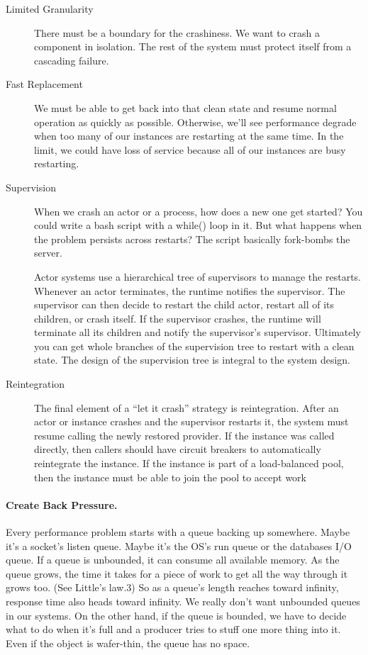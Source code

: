\begin{description}
  \item [Limited Granularity] There must be a boundary for the crashiness. We want to crash a component in isolation. The rest of the system must protect itself from a cascading failure.

  \item [Fast Replacement] We must be able to get back into that clean state and resume normal operation as quickly as possible. Otherwise, we’ll see performance degrade when too many of our instances are restarting at the same time. In the limit, we could have loss of service because all of our instances are busy restarting.

  \item [Supervision] When we crash an actor or a process, how does a new one get started? You could write a bash script with a while() loop in it. But what happens when the problem persists across restarts? The script basically fork-bombs the server.

Actor systems use a hierarchical tree of supervisors to manage the restarts. Whenever an actor terminates, the runtime notifies the supervisor. The supervisor can then decide to restart the child actor, restart all of its children, or crash itself. If the supervisor crashes, the runtime will terminate all its children and notify the supervisor’s supervisor. Ultimately you can get whole branches of the supervision tree to restart with a clean state. The design of the supervision tree is integral to the system design. 

\item [Reintegration] The final element of a “let it crash” strategy is reintegration. After an actor or instance crashes and the supervisor restarts it, the system must resume calling the newly restored provider. If the instance was called directly, then callers should have circuit breakers to automatically reintegrate the instance. If the instance is part of a load-balanced pool, then the instance must be able to join the pool to accept work

\end{description}

\paragraph{Create Back Pressure.} Every performance problem starts with a queue backing up somewhere. Maybe it’s a socket’s listen queue. Maybe it’s the OS’s run queue or the databases I/O queue. If a queue is unbounded, it can consume all available memory. As the queue grows, the time it takes for a piece of work to get all the way through it grows too. (See Little’s law.3) So as a queue’s length reaches toward infinity, response time also heads toward infinity. We really don’t want unbounded queues in our systems. On the other hand, if the queue is bounded, we have to decide what to do when it’s full and a producer tries to stuff one more thing into it. Even if the object is wafer-thin, the queue has no space.

